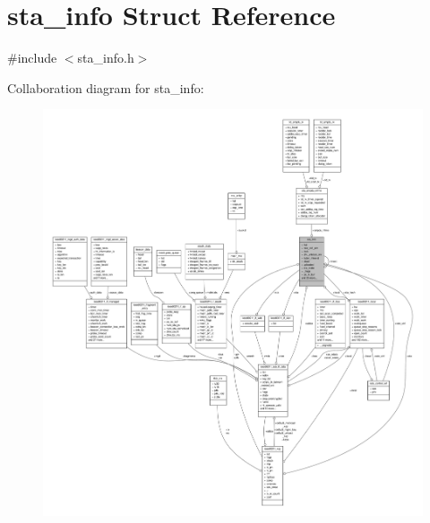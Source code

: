 \hypertarget{structsta__info}{\section{sta\-\_\-info Struct Reference}
\label{structsta__info}
}


{\ttfamily \#include $<$sta\-\_\-info.\-h$>$}



Collaboration diagram for sta\-\_\-info\-:
\nopagebreak
\begin{figure}[H]
\begin{center}
\leavevmode
\includegraphics[width=350pt]{structsta__info__coll__graph}
\end{center}
\end{figure}
